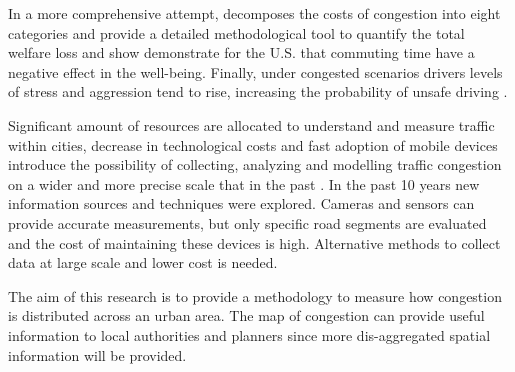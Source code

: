 \documentclass[a4paper]{jpconf}
\begin{document}
	In a more comprehensive attempt, \textcite{Bilbao-ubillos2008} decomposes the costs of congestion into eight categories and provide a detailed methodological tool to quantify the total welfare loss and \textcite{Choi2013} show demonstrate for the U.S. that commuting time have a negative effect in the well-being. Finally, under congested scenarios drivers levels of stress and aggression tend to rise, increasing the probability of unsafe driving \parencite{Hennessy199}.
	
	Significant amount of resources are allocated to understand and measure traffic within cities, decrease in technological costs and fast adoption of mobile devices introduce the possibility of collecting, analyzing and modelling traffic congestion on a wider and more precise scale that in the past \parencite{Rempe2016}. In the past 10 years new information sources and techniques were explored. Cameras and sensors can provide accurate measurements, but only specific road segments are evaluated and the cost of maintaining these devices is high. Alternative methods to collect data at large scale and lower cost is needed\parencite{Pongpaibool2007, Wang2015, Pattara-atikom2006}.\par
	
	
	
	
	The aim of this research is to provide a methodology to measure how congestion is distributed across an urban area. The map of congestion can provide useful information to local authorities and planners since more dis-aggregated spatial information will be provided. \par
	
\end{document}
